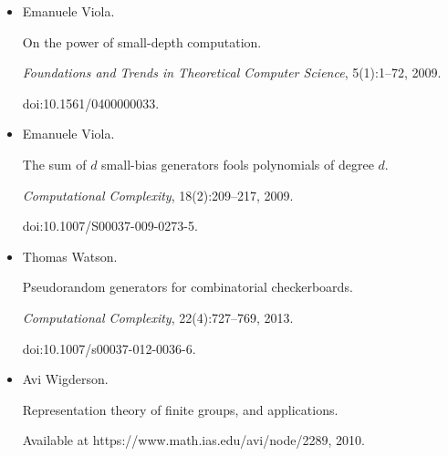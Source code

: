 \begin{itemize}
\emph{Foundations and Trends in Theoretical Computer Science},
7(1-3):1–336, 2012.


doi:10.1561/0400000010.





\item[] 
[50]

Emanuele Viola.


On the power of small-depth computation.


\emph{Foundations and Trends in Theoretical Computer Science},
5(1):1–72, 2009.


doi:10.1561/0400000033.





\item[] 
[51]

Emanuele Viola.


The sum of $d$ small-bias generators fools polynomials of degree $d$.


\emph{Computational Complexity}, 18(2):209–217, 2009.


doi:10.1007/S00037-009-0273-5.





\item[] 
[52]

Thomas Watson.


Pseudorandom generators for combinatorial checkerboards.


\emph{Computational Complexity}, 22(4):727–769, 2013.


doi:10.1007/s00037-012-0036-6.





\item[] 
[53]

Avi Wigderson.


Representation theory of finite groups, and applications.


Available at https://www.math.ias.edu/avi/node/2289, 2010.





\end{itemize}

